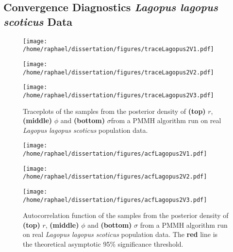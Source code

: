 \documentclass[12pt]{article}
\begin{document}
\begin{appendices}
	\subsection{Convergence Diagnostics \emph{Lagopus lagopus scoticus} Data}
	\begin{figure}[htb]
		\centering
		\begin{minipage}{0.5\textwidth}
			\centering
			\texttt{[image: /home/raphael/dissertation/figures/traceLagopus2V1.pdf]}
		\end{minipage}
		\begin{minipage}{0.5\textwidth}
			\centering
			\texttt{[image: /home/raphael/dissertation/figures/traceLagopus2V2.pdf]}
		\end{minipage}
		\begin{minipage}{0.5\textwidth}
			\centering
			\texttt{[image: /home/raphael/dissertation/figures/traceLagopus2V3.pdf]}
		\end{minipage}
		\caption[Traceplots of a run of a PMMH sampler run on real \emph{Lagopus lagopus scoticus} population data]{Traceplots of the samples from the posterior density of \textbf{(top)} $r$, \textbf{(middle)} $\phi$ and \textbf{(bottom)} $\sigma$from a PMMH algorithm run on real \emph{Lagopus lagopus scoticus} population data.} 
		\label{fig:traceLagopus}
	\end{figure}
	\begin{figure}[htb]
		\centering
		\begin{minipage}{0.5\textwidth}
			\centering
			\texttt{[image: /home/raphael/dissertation/figures/acfLagopus2V1.pdf]}
		\end{minipage}
		\begin{minipage}{0.5\textwidth}
			\centering
			\texttt{[image: /home/raphael/dissertation/figures/acfLagopus2V2.pdf]}
		\end{minipage}
		\begin{minipage}{0.5\textwidth}
			\centering
			\texttt{[image: /home/raphael/dissertation/figures/acfLagopus2V3.pdf]}
		\end{minipage}
		\caption[Autocorrelation functions of the samples from a PMMH algorithm run on real \emph{Lagopus lagopus scoticus} population data]{Autocorrelation function of the samples from the posterior density of \textbf{(top)} $r$, \textbf{(middle)} $\phi$ and \textbf{(bottom)} $\sigma$ from a PMMH algorithm run on real \emph{Lagopus lagopus scoticus} population data. The \textbf{red} line is the theoretical asymptotic 95\% significance threshold.}
		\label{fig:acfLagopus}
	\end{figure}


\end{appendices}
\end{document}
